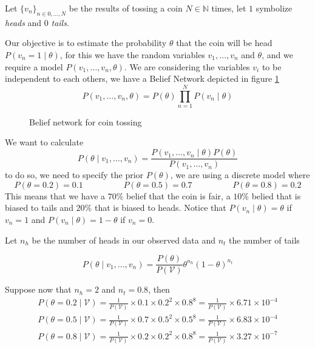 \begin{exampleth}
  Let \(\{v_n\}_{n \in 0,\dots,N}\) be the results of tossing a coin \(N \in
  \mathbb{N}\) times, let \(1\) symbolize \emph{heads} and \(0\) \emph{tails}.

  Our objective is to estimate the probability \(\theta\) that the coin will be
  head \(P(v_n = 1  \mid  \theta)\), for this we have the random variables \(v_1,\dots,v_n\)
  and \(\theta\), and we require a model \(P(v_1,\dots,v_n,\theta)\). We are
  considering the variables \(v_i\) to be independent to each others, we have a
  Belief Network depicted in figure \ref{fig:learning_coin}
  \[
    P(v_1,\dots,v_n,\theta) = P(\theta)\prod_{n=1}^N P(v_n \mid \theta)
  \]

\begin{figure}[H]
\centering
{}
\caption{Belief network for coin tossing}
\label{fig:learning_coin}
\end{figure}

We want to calculate
\[
  P(\theta \mid v_1,\dots,v_n) = \frac{P(v_1,\dots,v_n \mid \theta)P(\theta)}{P(v_1,\dots,v_n)}
\]
to do so, we need to specify the prior \(P(\theta)\), we are using a discrete
model where
\[
  P(\theta = 0.2) = 0.1 \hspace{2cm} P(\theta = 0.5) = 0.7 \hspace{2cm} P(\theta =
  0.8) = 0.2
\]
This means that we have a \(70\%\) belief that the coin is fair, a \(10\%\)
belied that is biased to tails and \(20\%\) that is biased to heads.
Notice that \(P(v_n \mid \theta) = \theta\) if \(v_n = 1\) and \(P(v_n \mid \theta) = 1 - \theta\) if \(v_n = 0\).

Let \(n_h\) be the number of heads in our observed data and \(n_t\)
the number of tails

\[
  P(\theta  \mid  v_1,\dots,v_n) = \frac{P(\theta)}{P(\mathcal{V})} \theta^{n_h}(1-\theta)^{n_t}
\]

Suppose now that \(n_h = 2\) and \(n_t = 0.8\), then
\begin{gather*}
  P(\theta = 0.2  \mid  \mathcal{V}) = \frac{1}{P(\mathcal{V})}\times 0.1 \times 0.2^{2}
  \times 0.8^{8} = \frac{1}{P(\mathcal{V})} \times 6.71\times10^{-4} \\
   P(\theta = 0.5  \mid  \mathcal{V}) = \frac{1}{P(\mathcal{V})}\times 0.7 \times 0.5^{2}
   \times 0.5^{8} = \frac{1}{P(\mathcal{V})} \times 6.83\times10^{-4}\\
    P(\theta = 0.8  \mid  \mathcal{V}) = \frac{1}{P(\mathcal{V})}\times 0.2 \times 0.2^{2}
  \times 0.8^{8} = \frac{1}{P(\mathcal{V})} \times 3.27\times10^{-7}
\end{gather*}


\end{exampleth}
